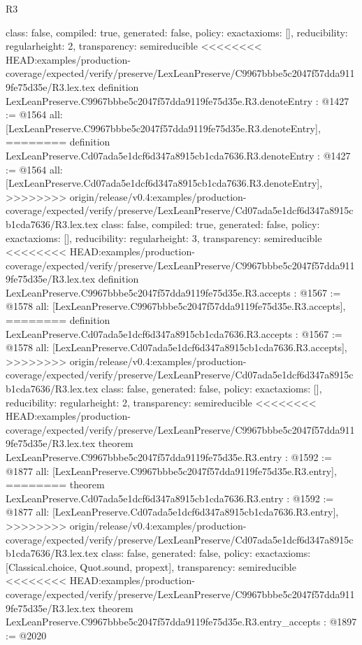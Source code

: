 \begin{lexlean}{R3}
\begin{coremodule}
{{{{{{{{{{{{  class: false,
  compiled: true,
  generated: false,
  policy: exact{axioms: []},
  reducibility: regular{height: 2},
  transparency: semireducible
}
<<<<<<<< HEAD:examples/production-coverage/expected/verify/preserve/LexLeanPreserve/C9967bbbe5c2047f57dda9119fe75d35e/R3.lex.tex
definition LexLeanPreserve.C9967bbbe5c2047f57dda9119fe75d35e.R3.denoteEntry : @1427 := @1564 {
  all: [LexLeanPreserve.C9967bbbe5c2047f57dda9119fe75d35e.R3.denoteEntry],
========
definition LexLeanPreserve.Cd07ada5e1dcf6d347a8915cb1cda7636.R3.denoteEntry : @1427 := @1564 {
  all: [LexLeanPreserve.Cd07ada5e1dcf6d347a8915cb1cda7636.R3.denoteEntry],
>>>>>>>> origin/release/v0.4:examples/production-coverage/expected/verify/preserve/LexLeanPreserve/Cd07ada5e1dcf6d347a8915cb1cda7636/R3.lex.tex
  class: false,
  compiled: true,
  generated: false,
  policy: exact{axioms: []},
  reducibility: regular{height: 3},
  transparency: semireducible
}
<<<<<<<< HEAD:examples/production-coverage/expected/verify/preserve/LexLeanPreserve/C9967bbbe5c2047f57dda9119fe75d35e/R3.lex.tex
definition LexLeanPreserve.C9967bbbe5c2047f57dda9119fe75d35e.R3.accepts : @1567 := @1578 {
  all: [LexLeanPreserve.C9967bbbe5c2047f57dda9119fe75d35e.R3.accepts],
========
definition LexLeanPreserve.Cd07ada5e1dcf6d347a8915cb1cda7636.R3.accepts : @1567 := @1578 {
  all: [LexLeanPreserve.Cd07ada5e1dcf6d347a8915cb1cda7636.R3.accepts],
>>>>>>>> origin/release/v0.4:examples/production-coverage/expected/verify/preserve/LexLeanPreserve/Cd07ada5e1dcf6d347a8915cb1cda7636/R3.lex.tex
  class: false,
  generated: false,
  policy: exact{axioms: []},
  reducibility: regular{height: 2},
  transparency: semireducible
}
<<<<<<<< HEAD:examples/production-coverage/expected/verify/preserve/LexLeanPreserve/C9967bbbe5c2047f57dda9119fe75d35e/R3.lex.tex
theorem LexLeanPreserve.C9967bbbe5c2047f57dda9119fe75d35e.R3.entry : @1592 := @1877 {
  all: [LexLeanPreserve.C9967bbbe5c2047f57dda9119fe75d35e.R3.entry],
========
theorem LexLeanPreserve.Cd07ada5e1dcf6d347a8915cb1cda7636.R3.entry : @1592 := @1877 {
  all: [LexLeanPreserve.Cd07ada5e1dcf6d347a8915cb1cda7636.R3.entry],
>>>>>>>> origin/release/v0.4:examples/production-coverage/expected/verify/preserve/LexLeanPreserve/Cd07ada5e1dcf6d347a8915cb1cda7636/R3.lex.tex
  class: false,
  generated: false,
  policy: exact{axioms: [Classical.choice, Quot.sound, propext]},
  transparency: semireducible
}
<<<<<<<< HEAD:examples/production-coverage/expected/verify/preserve/LexLeanPreserve/C9967bbbe5c2047f57dda9119fe75d35e/R3.lex.tex
theorem LexLeanPreserve.C9967bbbe5c2047f57dda9119fe75d35e.R3.entry_accepts : @1897 := @2020 {
}}}}}}}}}}}}}}}
\end{coremodule}
\end{lexlean}
